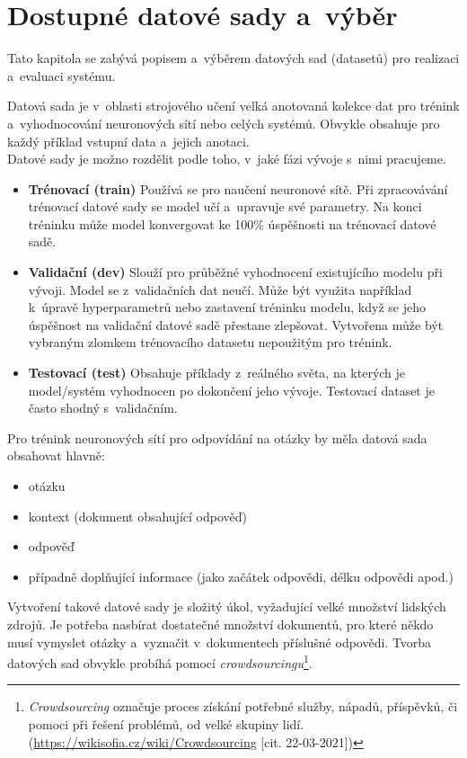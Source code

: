 \chapter{Dostupné datové sady a~výběr}
\label{available_datasets}
Tato kapitola se zabývá popisem a~výběrem datových sad (datasetů) pro realizaci a~evaluaci systému.\par
Datová sada je v~oblasti strojového učení velká anotovaná kolekce dat pro trénink a~vyhodnocování neuronových sítí nebo celých systémů. Obvykle obsahuje pro každý příklad vstupní data a~jejich anotaci.\\
Datové sady je možno rozdělit podle toho, v~jaké fázi vývoje s~nimi pracujeme.
\begin{itemize}
    \item \textbf{Trénovací (train)} Používá se pro naučení neuronové sítě. Při zpracovávání trénovací datové sady se model učí a~upravuje své parametry. Na konci tréninku může model konvergovat ke 100\% úspěšnosti na trénovací datové sadě.
    \item \textbf{Validační (dev)} Slouží pro průběžné vyhodnocení existujícího modelu při vývoji. Model se z~validačních dat neučí. Může být využita například k~úpravě hyperparametrů nebo zastavení tréninku modelu, když se jeho úspěšnost na validační datové sadě přestane zlepšovat. Vytvořena může být vybraným zlomkem trénovacího datasetu nepoužitým pro trénink.
    \item \textbf{Testovací (test)} Obsahuje příklady z~reálného světa, na kterých je model/systém vyhodnocen po dokončení jeho vývoje. Testovací dataset je často shodný s~validačním.
\end{itemize}
Pro trénink neuronových sítí pro odpovídání na otázky by měla datová sada obsahovat hlavně:
\begin{itemize}
    \item otázku
    \item kontext (dokument obsahující odpověď)
    \item odpověď
    \item případně doplňující informace (jako začátek odpovědi, délku odpovědi apod.)
\end{itemize}
Vytvoření takové datové sady je složitý úkol, vyžadující velké množství lidských zdrojů. Je potřeba nasbírat dostatečné množství dokumentů, pro které někdo musí vymyslet otázky a~vyznačit v~dokumentech příslušné odpovědi. Tvorba datových sad obvykle probíhá pomocí \emph{crowdsourcingu}\footnote{\emph{Crowdsourcing} označuje proces získání potřebné služby, nápadů, příspěvků, či pomoci při řešení problémů, od velké skupiny lidí. (\url{https://wikisofia.cz/wiki/Crowdsourcing} [cit. 22-03-2021])}.

